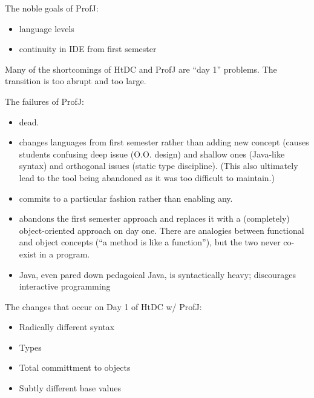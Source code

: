 \documentclass[submission,copyright]{eptcs}
\begin{document}
\cite{dvanhorn:Gray2003ProfessorJ}

\cite{dvanhorn:Allen2002DrJava, dvanhorn:Hsia2005Taming}

\cite{dvanhorn:Kolling2003}

\cite{dvanhorn:Bruce2001Library}

\cite{dvanhorn:Alphonce2003Using}

\cite{dvanhorn:Chakravarty2004Risks}

\cite{dvanhorn:Ragde2008Chilling}

\cite{dvanhorn:Bloch2000Scheme}

The noble goals of ProfJ:

\begin{itemize}
\item language levels
\item continuity in IDE from first semester
\end{itemize}

Many of the shortcomings of HtDC and ProfJ are ``day 1'' problems.
The transition is too abrupt and too large.

The failures of  ProfJ:

\begin{itemize}
\item dead.
\item changes languages from first semester rather than adding new
  concept (causes students confusing deep issue (O.O. design) and
  shallow ones (Java-like syntax) and orthogonal issues (static type
  discipline).  (This also ultimately lead to the tool being abandoned
  as it was too difficult to maintain.)

\item commits to a particular fashion rather than enabling any.

\item abandons the first semester approach and replaces it with a
  (completely) object-oriented approach on day one.  There are
  analogies between functional and object concepts (``a method is like
  a function''), but the two never co-exist in a program.

\item Java, even pared down pedagoical Java, is syntactically heavy; discourages
  interactive programming

\end{itemize}

The changes that occur on Day 1 of HtDC w/ ProfJ:

\begin{itemize}
\item Radically different syntax
\item Types
\item Total committment to objects
\item Subtly different base values
\end{itemize}
\end{document}
